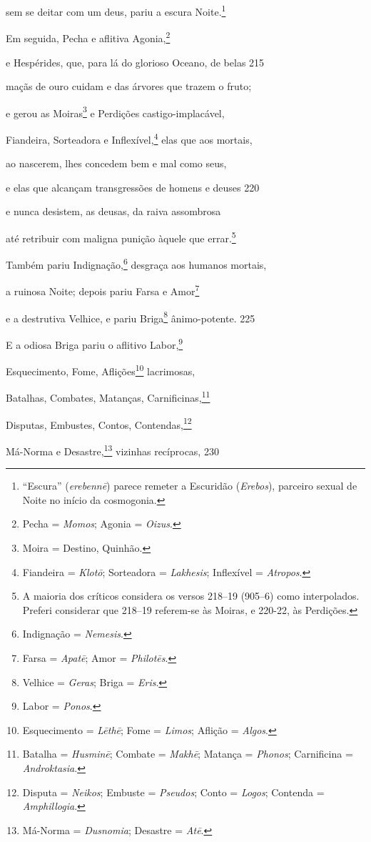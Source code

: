 sem se deitar com um deus, pariu a escura Noite.\footnote{``Escura'' (\emph{erebennē}) parece remeter a Escuridão (\emph{Erebos}), parceiro sexual de Noite no início da cosmogonia.}

Em seguida, Pecha e aflitiva Agonia,\footnote{Pecha = \emph{Momos}; Agonia = \emph{Oizus}.}

e Hespérides, que, para lá do glorioso Oceano, de belas \num{215}

maçãs de ouro cuidam e das árvores que trazem o fruto;

e gerou as Moiras\footnote{Moira = Destino, Quinhão.} e Perdições castigo-implacável,

Fiandeira, Sorteadora e Inflexível,\footnote{Fiandeira = \emph{Klotō}; Sorteadora = \emph{Lakhesis}; Inflexível = \emph{Atropos}.} elas que aos mortais,

ao nascerem, lhes concedem bem e mal como seus,

e elas que alcançam transgressões de homens e deuses \num{220}

e nunca desistem, as deusas, da raiva assombrosa

até retribuir com maligna punição àquele que errar.\footnote{A maioria dos críticos considera os versos 218--19
(905--6) como interpolados. Preferi considerar que
218--19 referem-se às Moiras, e 220-22, às Perdições.}

Também pariu Indignação,\footnote{Indignação = \emph{Nemesis}.} desgraça aos humanos mortais,

a ruinosa Noite; depois pariu Farsa e Amor\footnote{Farsa = \emph{Apatē}; Amor
= \emph{Philotēs}.}

e a destrutiva Velhice, e pariu Briga\footnote{Velhice = \emph{Geras}; Briga = \emph{Eris}.} ânimo-potente. \num{225}

\quad{}E a odiosa Briga pariu o aflitivo Labor,\footnote{Labor = \emph{Ponos}.}

Esquecimento, Fome, Aflições\footnote{Esquecimento = \emph{Lēthē}; Fome =
\emph{Limos}; Aflição = \emph{Algos}.} lacrimosas,

Batalhas, Combates, Matanças, Carnificinas,\footnote{Batalha = \emph{Husminē}; Combate
= \emph{Makhē}; Matança = \emph{Phonos}; Carnificina = \emph{Androktasia}.}

Disputas, Embustes, Contos, Contendas,\footnote{Disputa = \emph{Neikos}; Embuste = \emph{Pseudos}; Conto = \emph{Logos}; Contenda = \emph{Amphillogia}.}

Má-Norma e Desastre,\footnote{Má-Norma =
\emph{Dusnomia}; Desastre = \emph{Atē}.} vizinhas recíprocas, \num{230}

